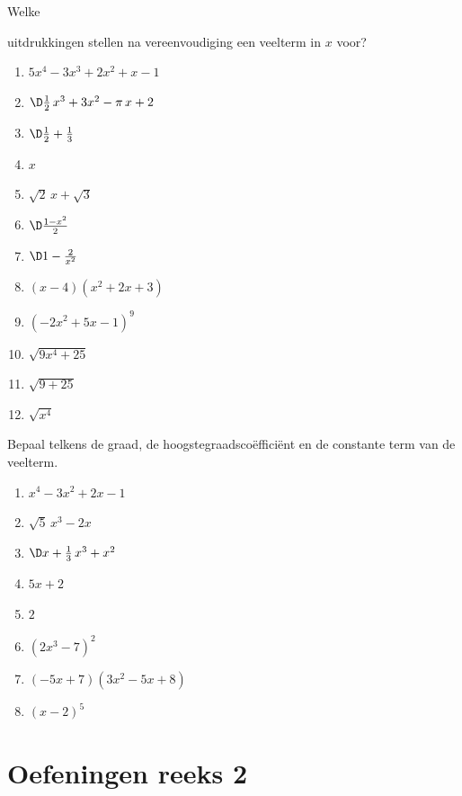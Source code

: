 \documentclass{ximera}
\begin{document}
\begin{Oefening}\setcounter{enumi}{3}
\hypertarget{oef1.3}{Welke} uitdrukkingen stellen na vereenvoudiging een veelterm in $x$ voor? 
\begin{multicols}{2}
\begin{enumerate}

\item
$5x^4-3x^3+2x^2+x-1$
\item
$\D \frac{1}{2}\,x^3 + 3x^2-\pi\,x+2$
\item
$\D \frac{1}{2}+\frac{1}{3}$
\item
$x$
\item
$\sqrt{2}\,x + \sqrt{3}$
\item
$\D \frac{1-x^2}{2}$ 
\item
$\D 1-\frac{2}{x^2}$
\item
$(x-4)(x^2+2x+3)$
\item
$(-2x^2+5x-1)^{9}$
\item
$\sqrt{9x^4+25}$
\item
$\sqrt{9+25}$
\item
$\sqrt{x^4}$
\end{enumerate}
\end{multicols}
\end{Oefening}

\begin{Oefening} %
Bepaal telkens de graad, de hoogstegraadsco\"effici\"ent en de constante term van de veelterm.
\begin{multicols}{2}
\begin{enumerate}

\item
$x^4-3x^2+2x-1$
\item
$\sqrt{5}\,x^3-2x$
\item
$\D x+\frac{1}{3}\,x^3+x^2$
\item
$5x+2$
\item
$2$
\item
$(2x^3-7)^2$
\item
$(-5x+7)(3x^2-5x+8)$
\item
$(x-2)^5$
\end{enumerate}
\end{multicols}
\end{Oefening}

\section*{Oefeningen reeks 2}
\end{document}
